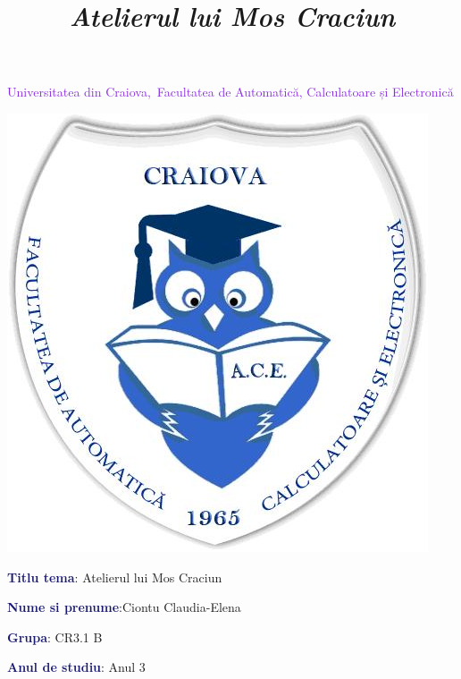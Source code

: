 \documentclass{article}
\begin{document}
\thispagestyle{plain}%




\begin{center}
\Large
\textcolor{BlueViolet}{{Universitatea din Craiova,\ Facultatea de Automatică, Calculatoare și Electronică}}\\
    \vspace{7mm}
     \end{center} 
    \begin{center}
          
    \textbf{\includegraphics[scale=0.5]{logo-ace.jpeg}}
\end{center}

\title{\textbf{\textit{Atelierul lui Mos Craciun}}}

\vspace{1em}
\LARGE
\textbf{\textcolor{MidnightBlue}{{  Titlu tema}}}: Atelierul lui Mos Craciun

\LARGE
\vspace{1em}
\textbf{\textcolor{MidnightBlue}{{Nume si prenume}}}:Ciontu Claudia-Elena

\LARGE
\vspace{1em}
\textbf{\textcolor{MidnightBlue}{{Grupa}}}: CR3.1 B

\LARGE
\vspace{1em}
\textbf{\textcolor{MidnightBlue}{{Anul de studiu}}}: Anul 3
\end{document}
